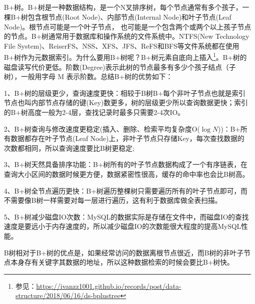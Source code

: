 \documentclass[../../../interview-questions.tex]{subfiles}
\begin{document}
\subsection{\color{red}{MySQL索引的数据结构}}

B+树。B+树是一种数据结构，是一个N叉排序树，每个节点通常有多个孩子，一棵B+树包含根节点(Root Node)、内部节点(Internal Node)和叶子节点(Leaf Node)。根节点可能是一个叶子节点， 也可能是一个包含两个或两个以上孩子节点的节点。B+树通常用于数据库和操作系统的文件系统中。NTFS(New Technology File System)、ReiserFS、NSS、XFS、JFS、ReFS和BFS等文件系统都在使用B+树作为元数据索引。为什么要用B+树呢？B+树元素自底向上插入\footnote{参见：\url{https://ivanzz1001.github.io/records/post/data-structure/2018/06/16/ds-bplustree}}。B+树的磁盘读写代价更低。阶数(Degree)表示此树的节点最多有多少个孩子结点（子树），一般用字母 M 表示阶数。总结B+树的优势如下：

1、B+树的层级更少，查询速度更快：相较于B树B+每个非叶子节点也就是索引节点也叫内部节点存储的键(Key)数更多，树的层级更少所以查询数据更快；索引的B+树高度一般为2-4层，查找记录时最多只需要2-4次IO。

2、B+树查询与修改速度更稳定(插入、删除、检索平均复杂度O($\log N$))：B+所有数据都存在叶子节点(Leaf Node)上，非叶子节点只存储Key，每次查找数据的次数都相同，所以查询速度要比B树更稳定;

3、B+树天然具备排序功能：B+树所有的叶子节点数据构成了一个有序链表，在查询大小区间的数据时候更方便，数据紧密性很高，缓存的命中率也会比B树高。

4、B+树全节点遍历更快：B+树遍历整棵树只需要遍历所有的叶子节点即可，而不需要像B树一样需要对每一层进行遍历，这有利于数据库做全表扫描。

5、B+树减少磁盘IO次数：MySQL的数据实际是存储在文件中，而磁盘IO的查找速度是要远小于内存速度的，所以减少磁盘IO的次数能很大程度的提高MySQL性能。

B树相对于B+树的优点是，如果经常访问的数据离根节点很近，而B树的非叶子节点本身存有关键字其数据的地址，所以这种数据检索的时候会要比B+树快。
\end{document}
